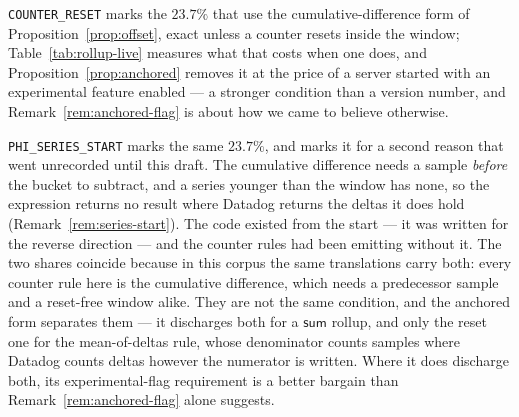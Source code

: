 \begin{remark}\label{rem:counter-caveats}
\texttt{COUNTER\_RESET} marks the $23.7\%$ that use the cumulative-difference form of
Proposition~\ref{prop:offset}, exact unless a counter resets inside the window;
Table~\ref{tab:rollup-live} measures what that costs when one does, and
Proposition~\ref{prop:anchored} removes it at the price of a server started with an
experimental feature enabled --- a stronger condition than a version number, and
Remark~\ref{rem:anchored-flag} is about how we came to believe otherwise.

\texttt{PHI\_SERIES\_START} marks the same $23.7\%$, and marks it for a second reason
that went unrecorded until this draft. The cumulative difference needs a sample
\emph{before} the bucket to subtract, and a series younger than the window has none, so
the expression returns no result where Datadog returns the deltas it does hold
(Remark~\ref{rem:series-start}). The code existed from the start --- it was written for
the reverse direction --- and the counter rules had been emitting without it. The two
shares coincide because in this corpus the same translations carry both: every counter
rule here is the cumulative difference, which needs a predecessor sample and a
reset-free window alike. They are not the same condition, and the anchored form
separates them --- it discharges both for a $\mathsf{sum}$ rollup, and only the reset
one for the mean-of-deltas rule, whose denominator counts samples where Datadog counts
deltas however the numerator is written. Where it does discharge both, its
experimental-flag requirement is a better bargain than
Remark~\ref{rem:anchored-flag} alone suggests.
\end{remark}
